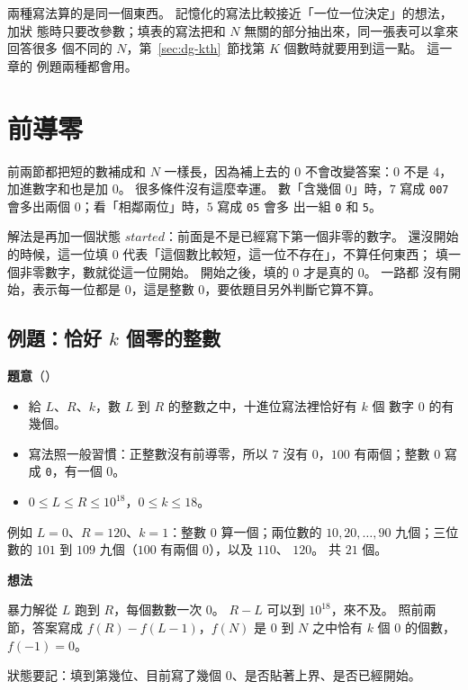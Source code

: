兩種寫法算的是同一個東西。 記憶化的寫法比較接近「一位一位決定」的想法，加狀
態時只要改參數；填表的寫法把和 $N$ 無關的部分抽出來，同一張表可以拿來回答很多
個不同的 $N$，第~\ref{sec:dg-kth}~節找第 $K$ 個數時就要用到這一點。 這一章的
例題兩種都會用。

\section{前導零}
\label{sec:dg-started}

前兩節都把短的數補成和 $N$ 一樣長，因為補上去的 $0$ 不會改變答案：$0$ 不是
$4$，加進數字和也是加 $0$。 很多條件沒有這麼幸運。 數「含幾個 $0$」時，$7$
寫成 \texttt{007} 會多出兩個 $0$；看「相鄰兩位」時，$5$ 寫成 \texttt{05} 會多
出一組 \texttt{0} 和 \texttt{5}。

解法是再加一個狀態 $\mathit{started}$：前面是不是已經寫下第一個非零的數字。
還沒開始的時候，這一位填 $0$ 代表「這個數比較短，這一位不存在」，不算任何東西；
填一個非零數字，數就從這一位開始。 開始之後，填的 $0$ 才是真的 $0$。 一路都
沒有開始，表示每一位都是 $0$，這是整數 $0$，要依題目另外判斷它算不算。

\subsection{例題：恰好 \texorpdfstring{$k$}{k} 個零的整數}
\label{sec:dg-ex-zeros}

\textbf{題意}（）

\begin{itemize}
\item 給 $L$、$R$、$k$，數 $L$ 到 $R$ 的整數之中，十進位寫法裡恰好有 $k$ 個
數字 $0$ 的有幾個。
\item 寫法照一般習慣：正整數沒有前導零，所以 $7$ 沒有 $0$，$100$ 有兩個；整數
$0$ 寫成 \texttt{0}，有一個 $0$。
\item $0 \le L \le R \le 10^{18}$，$0 \le k \le 18$。
\end{itemize}

例如 $L = 0$、$R = 120$、$k = 1$：整數 $0$ 算一個；兩位數的 $10, 20, \ldots,
90$ 九個；三位數的 $101$ 到 $109$ 九個（$100$ 有兩個 $0$），以及 $110$、
$120$。 共 $21$ 個。

\textbf{想法}

暴力解從 $L$ 跑到 $R$，每個數數一次 $0$。 $R - L$ 可以到 $10^{18}$，來不及。
照前兩節，答案寫成 $f(R) - f(L - 1)$，$f(N)$ 是 $0$ 到 $N$ 之中恰有 $k$ 個 $0$
的個數，$f(-1) = 0$。

狀態要記：填到第幾位、目前寫了幾個 $0$、是否貼著上界、是否已經開始。

